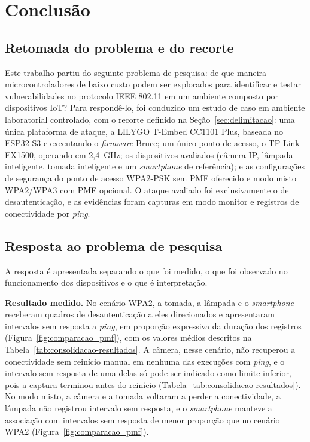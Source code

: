 \chapter{Conclusão}
\label{cap:conclusao}

\section{Retomada do problema e do recorte}

Este trabalho partiu do seguinte problema de pesquisa: de que maneira microcontroladores de baixo custo podem ser explorados para identificar e testar vulnerabilidades no protocolo IEEE 802.11 em um ambiente composto por dispositivos IoT? Para respondê-lo, foi conduzido um estudo de caso em ambiente laboratorial controlado, com o recorte definido na Seção~\ref{sec:delimitacao}: uma única plataforma de ataque, a LILYGO T-Embed CC1101 Plus, baseada no ESP32-S3 e executando o \textit{firmware} Bruce; um único ponto de acesso, o TP-Link EX1500, operando em 2,4~GHz; os dispositivos avaliados (câmera IP, lâmpada inteligente, tomada inteligente e um \textit{smartphone} de referência); e as configurações de segurança do ponto de acesso WPA2-PSK sem PMF oferecido e modo misto WPA2/WPA3 com PMF opcional. O ataque avaliado foi exclusivamente o de desautenticação, e as evidências foram capturas em modo monitor e registros de conectividade por \textit{ping}.

\section{Resposta ao problema de pesquisa}

A resposta é apresentada separando o que foi medido, o que foi observado no funcionamento dos dispositivos e o que é interpretação.

\textbf{Resultado medido.} No cenário WPA2, a tomada, a lâmpada e o \textit{smart\-phone} receberam quadros de desautenticação a eles direcionados e apresentaram intervalos sem resposta a \textit{ping}, em proporção expressiva da duração dos registros (Figura~\ref{fig:comparacao_pmf}), com os valores médios descritos na Tabela~\ref{tab:consolidacao-resultados}. A câmera, nesse cenário, não recuperou a conectividade sem reinício manual em nenhuma das execuções com \textit{ping}, e o intervalo sem resposta de uma delas só pode ser indicado como limite inferior, pois a captura terminou antes do reinício (Tabela~\ref{tab:consolidacao-resultados}). No modo misto, a câmera e a tomada voltaram a perder a conectividade, a lâmpada não registrou intervalo sem resposta, e o \textit{smartphone} manteve a associação com intervalos sem resposta de menor proporção que no cenário WPA2 (Figura~\ref{fig:comparacao_pmf}).


